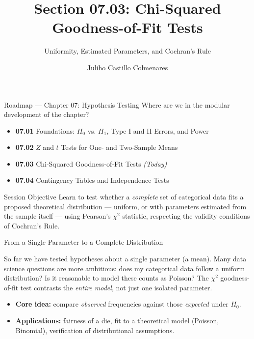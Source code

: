\documentclass[10pt, aspectratio=169]{beamer}
\title[$\chi^2$ Goodness-of-Fit]{Section 07.03: Chi-Squared Goodness-of-Fit Tests}
\subtitle{Uniformity, Estimated Parameters, and Cochran's Rule}
\author[J. Castillo Colmenares]{Juliho Castillo Colmenares}
\institute{Tecnológico de Monterrey}
\date{\vspace{-1.5cm}}
\begin{document}
\begin{frame}[plain]
  \titlepage
\end{frame}

\begin{frame}{Roadmap --- Chapter 07: Hypothesis Testing}
  \footnotesize
  Where are we in the modular development of the chapter? \pause
  \begin{itemize}\itemsep=0.08em
    \item \textbf{07.01} Foundations: $H_0$ vs. $H_1$, Type I and II Errors, and Power \pause
    \item \textbf{07.02} $Z$ and $t$ Tests for One- and Two-Sample Means \pause
    \item \textbf{07.03} Chi-Squared Goodness-of-Fit Tests \emph{(Today)} \pause
    \item \textbf{07.04} Contingency Tables and Independence Tests
  \end{itemize}
  \vspace{-0.05cm}
  \begin{block}{Session Objective}
    Learn to test whether a \emph{complete} set of categorical data fits a proposed theoretical distribution --- uniform, or with parameters estimated from the sample itself --- using Pearson's $\chi^2$ statistic, respecting the validity conditions of Cochran's Rule.
  \end{block}
\end{frame}

\begin{frame}{From a Single Parameter to a Complete Distribution}
  \footnotesize
  \begin{motivacion}
    So far we have tested hypotheses about a single parameter (a mean). Many data science questions are more ambitious: does my categorical data follow a uniform distribution? Is it reasonable to model these counts as Poisson? The $\chi^2$ goodness-of-fit test contrasts the \emph{entire model}, not just one isolated parameter.
  \end{motivacion}

  \vspace{0.15cm}
  \pause
  \begin{itemize}\itemsep=0.1cm
    \item \textbf{Core idea:} compare \emph{observed} frequencies against those \emph{expected} under $H_0$. \pause
    \item \textbf{Applications:} fairness of a die, fit to a theoretical model (Poisson, Binomial), verification of distributional assumptions.
  \end{itemize}
\end{frame}
\end{document}
